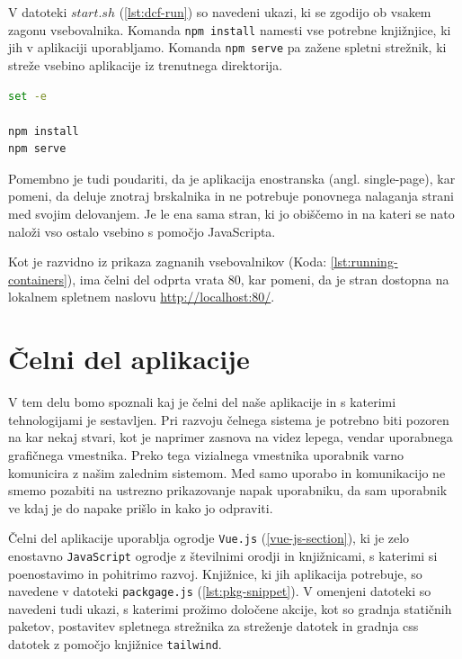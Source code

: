 \documentclass[a4paper, 12pt]{book}
\begin{document}
V datoteki $start.sh$ (\ref{lst:dcf-run}) so navedeni ukazi, ki se zgodijo ob vsakem zagonu vsebovalnika. Komanda \texttt{npm install} namesti vse potrebne knjižnjice, ki jih v aplikaciji uporabljamo. Komanda \texttt{npm serve} pa zažene spletni strežnik, ki streže vsebino aplikacije iz trenutnega direktorija.

\begin{lstlisting}[language=bash,style=mystyle,caption={Ukazna datoteka, ki nasneme potrebne knjižnice in streže aplikacijo},label=lst:dcf-run]
set -e

npm install
npm serve
\end{lstlisting}

Pomembno je tudi poudariti, da je aplikacija enostranska (angl. single-page), kar pomeni, da deluje znotraj brskalnika in ne potrebuje ponovnega nalaganja strani med svojim delovanjem. Je le ena sama stran, ki jo obiščemo in na kateri se nato naloži vso ostalo vsebino s pomočjo JavaScripta.

Kot je razvidno iz prikaza zagnanih vsebovalnikov (Koda: \ref{lst:running-containers}), ima čelni del odprta vrata 80, kar pomeni, da je stran dostopna na lokalnem spletnem naslovu \url{http://localhost:80/}. 


\section{Čelni del aplikacije}
V tem delu bomo spoznali kaj je čelni del naše aplikacije in s katerimi tehnologijami je sestavljen. Pri razvoju čelnega sistema je potrebno biti pozoren na kar nekaj stvari, kot je naprimer zasnova na videz lepega, vendar uporabnega grafičnega vmestnika. Preko tega vizialnega vmestnika uporabnik varno komunicira z našim zalednim sistemom. Med samo uporabo in komunikacijo ne smemo pozabiti na ustrezno prikazovanje napak uporabniku, da sam uporabnik ve kdaj je do napake prišlo in kako jo odpraviti.

Čelni del aplikacije uporablja ogrodje \verb=Vue.js= (\ref{vue-js-section}), ki je zelo enostavno \verb=JavaScript= ogrodje z številnimi orodji in knjižnicami, s katerimi si poenostavimo in pohitrimo razvoj. Knjižnice, ki jih aplikacija potrebuje, so navedene v datoteki \verb=packgage.js= (\ref{lst:pkg-snippet}). V omenjeni datoteki so navedeni tudi ukazi, s katerimi prožimo določene akcije, kot so gradnja statičnih paketov, postavitev spletnega strežnika za streženje datotek in gradnja css datotek z pomočjo knjižnice \verb=tailwind=. 
\end{document}
